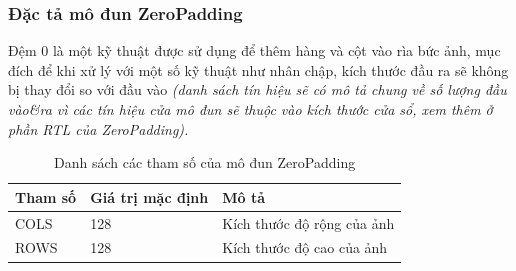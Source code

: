 \subsubsection{Đặc tả mô đun ZeroPadding}
Đệm 0 là một kỹ thuật được sử dụng để thêm hàng và cột vào rìa bức ảnh, mục đích để khi xử lý với một số kỹ thuật như nhân chập, kích thước đầu ra sẽ không bị thay đổi so với đầu vào \textit{(danh sách tín hiệu sẽ có mô tả chung về số lượng đầu vào\&ra vì các tín hiệu cửa mô đun sẽ thuộc vào kích thước cửa sổ, xem thêm ở phần RTL của ZeroPadding).}




\begin{table}[!ht]
    \centering
    \renewcommand{\arraystretch}{1.3} %
    \begin{tabular}{|p{3cm} p{4cm} p{8cm}|}
        \hline
        \rowcolor{gray!30}
        \textbf{Tham số } & \textbf{Giá trị mặc định}  & \textbf{Mô tả} \\
        \hline
        COLS & 128 & Kích thước độ rộng của ảnh
        \\ \hline
        ROWS & 128 & Kích thước độ cao của ảnh
        \\ \hline
    \end{tabular}
    \caption{Danh sách các tham số của mô đun ZeroPadding }
    \label{tab:paramListZeroPadding}
\end{table}


